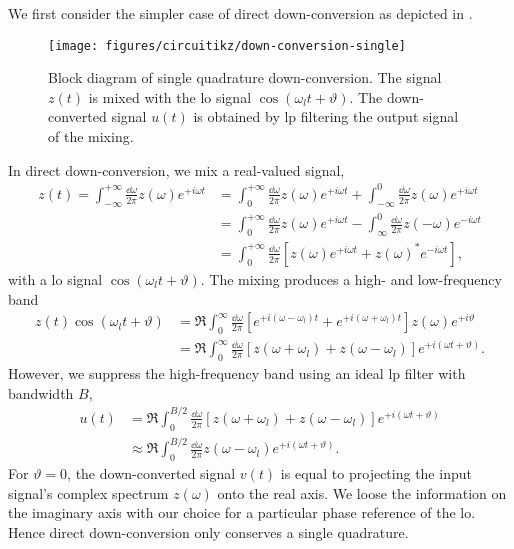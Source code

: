 We first consider the simpler case of direct down-conversion as depicted in .
\begin{figure}[htb]
	\centering
	\texttt{[image: figures/circuitikz/down-conversion-single]}
	\caption{Block diagram of single quadrature down-conversion. The signal $z(t)$ is mixed with the \gls{lo} signal $\cos(\omega_lt+\vartheta)$. The down-converted signal $u(t)$ is obtained by \gls{lp} filtering the output signal of the mixing.}\label{fig:down_conversion_single}
\end{figure}
In direct down-conversion, we mix a real-valued signal,
\begin{equation}
	\begin{split}
		z(t)
		=
		\int_{-\infty}^{+\infty}\frac{\dd{\omega}}{2\pi}
		z(\omega)
		e^{+i\omega t}
		&=
		\int_0^{+\infty}\frac{\dd{\omega}}{2\pi}
		z(\omega)
		e^{+i\omega t}
		+
		\int_{-\infty}^0\frac{\dd{\omega}}{2\pi}
		z(\omega)
		e^{+i\omega t}
		\\
		&=
		\int_0^{+\infty}\frac{\dd{\omega}}{2\pi}
		z(\omega)
		e^{+i\omega t}
		-
		\int_{\infty}^0\frac{\dd{\omega}}{2\pi}
		z(-\omega)
		e^{-i\omega t}
		\\
		&=
		\int_0^{+\infty}\frac{\dd{\omega}}{2\pi}
		\left[
			z(\omega)
			e^{+i\omega t}
			+
			z(\omega)^*
			e^{-i\omega t}
		\right]
		,
	\end{split}
\end{equation}
with a \gls{lo} signal $\cos(\omega_lt+\vartheta)$.
The mixing produces a high- and low-frequency band
\begin{equation}
	\begin{split}
		z(t)
		\cos(\omega_lt+\vartheta)
		&=
		\Re
		\int_0^\infty\frac{\dd{\omega}}{2\pi}
		\left[
			e^{+i(\omega-\omega_l)t}
			+
			e^{+i(\omega+\omega_l)t}
		\right]
		z(\omega)
		e^{+i\vartheta}
		\\
		&=
		\Re
		\int_0^\infty\frac{\dd{\omega}}{2\pi}
		\left[
			z(\omega+\omega_l)
			+
			z(\omega-\omega_l)
		\right]
		e^{+i(\omega t+\vartheta)}
		.
	\end{split}
\end{equation}
However, we suppress the high-frequency band using an ideal \gls{lp} filter with bandwidth $B$,
\begin{equation}
	\begin{split}
		u(t)
		&=
		\Re
		\int_0^{B/2}\frac{\dd{\omega}}{2\pi}
		\left[
			z(\omega+\omega_l)
			+
			z(\omega-\omega_l)
		\right]
		e^{+i(\omega t+\vartheta)}
		\\
		&\approx
		\Re
		\int_0^{B/2}\frac{\dd{\omega}}{2\pi}
		z(\omega-\omega_l)
		e^{+i(\omega t+\vartheta)}
		.
	\end{split}
	\label{eq:down_conversion_real}
\end{equation}
For $\vartheta=0$, the down-converted signal $v(t)$ is equal to projecting the input signal's complex spectrum $z(\omega)$ onto the real axis.
We loose the information on the imaginary axis with our choice for a particular phase reference of the \gls{lo}.
Hence direct down-conversion only conserves a single quadrature.

